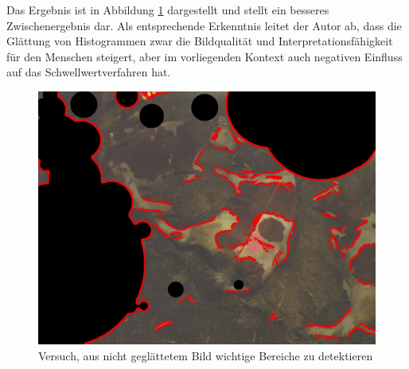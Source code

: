 Das Ergebnis ist in Abbildung \ref{fig: Versuch, aus nicht geglättetem Bild wichtige Bereiche zu detektieren} dargestellt und stellt ein besseres Zwischenergebnis dar. Als entsprechende Erkenntnis leitet der Autor ab, dass die Glättung von Histogrammen zwar die Bildqualität und Interpretationsfähigkeit für den Menschen steigert, aber im vorliegenden Kontext auch negativen Einfluss auf das Schwellwertverfahren hat.

\begin{figure}[H]
	\center
	\includegraphics[scale=0.43]{Grafiken/entwicklung/11thresholdedNotEqualized.jpg}
	\caption{Versuch, aus nicht geglättetem Bild wichtige Bereiche zu detektieren} 
	\label{fig: Versuch, aus nicht geglättetem Bild wichtige Bereiche zu detektieren} 
\end{figure}

